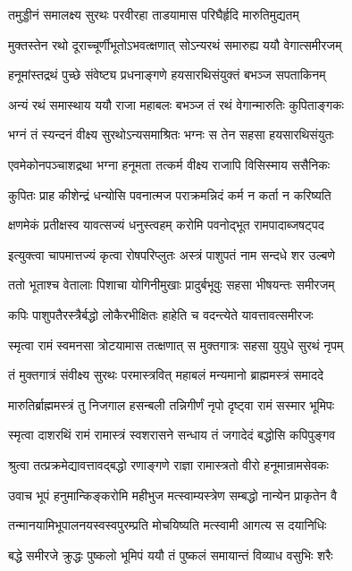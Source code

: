 \twolineshloka
{तमुड्डीनं समालक्ष्य सुरथः परवीरहा}
{ताडयामास परिघैर्हृदि मारुतिमुद्यतम्}%

\twolineshloka
{मुक्तस्तेन रथो दूराच्चूर्णीभूतोऽभवत्क्षणात्}
{सोऽन्यरथं समारुह्य ययौ वेगात्समीरजम्}%

\twolineshloka
{हनूमांस्तद्रथं पुच्छे संवेष्ट्य प्रधनाङ्गणे}
{हयसारथिसंयुक्तं बभञ्ज सपताकिनम्}%

\twolineshloka
{अन्यं रथं समास्थाय ययौ राजा महाबलः}
{बभञ्ज तं रथं वेगान्मारुतिः कुपिताङ्गकः}%

\twolineshloka
{भग्नं तं स्यन्दनं वीक्ष्य सुरथोऽन्यसमाश्रितः}
{भग्नः स तेन सहसा हयसारथिसंयुतः}%

\twolineshloka
{एवमेकोनपञ्चाशद्रथा भग्ना हनूमता}
{तत्कर्म वीक्ष्य राजापि विसिस्माय ससैनिकः}%

\twolineshloka
{कुपितः प्राह कीशेन्द्रं धन्योसि पवनात्मज}
{पराक्रमन्निदं कर्म न कर्ता न करिष्यति}%

\twolineshloka
{क्षणमेकं प्रतीक्षस्व यावत्सज्यं धनुस्त्वहम्}
{करोमि पवनोद्भूत रामपादाब्जषट्पद}%

\twolineshloka
{इत्युक्त्वा चापमात्तज्यं कृत्वा रोषपरिप्लुतः}
{अस्त्रं पाशुपतं नाम सन्दधे शर उल्बणे}%

\twolineshloka
{ततो भूताश्च वेतालाः पिशाचा योगिनीमुखाः}
{प्रादुर्बभूवुः सहसा भीषयन्तः समीरजम्}%

\twolineshloka
{कपिः पाशुपतैरस्त्रैर्बद्धो लोकैरभीक्षितः}
{हाहेति च वदन्त्येते यावत्तावत्समीरजः}%

\twolineshloka
{स्मृत्वा रामं स्वमनसा त्रोटयामास तत्क्षणात्}
{स मुक्तगात्रः सहसा युयुधे सुरथं नृपम्}%

\twolineshloka
{तं मुक्तगात्रं संवीक्ष्य सुरथः परमास्त्रवित्}
{महाबलं मन्यमानो ब्राह्ममस्त्रं समाददे}%

\twolineshloka
{मारुतिर्ब्राह्ममस्त्रं तु निजगाल हसन्बली}
{तन्निगीर्णं नृपो दृष्ट्वा रामं सस्मार भूमिपः}%

\twolineshloka
{स्मृत्वा दाशरथिं रामं रामास्त्रं स्वशरासने}
{सन्धाय तं जगादेदं बद्धोसि कपिपुङ्गव}%

\twolineshloka
{श्रुत्वा तत्प्रक्रमेद्यावत्तावद्बद्धो रणाङ्गणे}
{राज्ञा रामास्त्रतो वीरो हनूमान्रामसेवकः}%

\twolineshloka
{उवाच भूपं हनुमान्किङ्करोमि महीभुज}
{मत्स्वाम्यस्त्रेण सम्बद्धो नान्येन प्राकृतेन वै}%

\twolineshloka
{तन्मानयामिभूपालनयस्वस्वपुरम्प्रति}
{मोचयिष्यति मत्स्वामी आगत्य स दयानिधिः}%

\twolineshloka
{बद्धे समीरजे क्रुद्धः पुष्कलो भूमिपं ययौ}
{तं पुष्कलं समायान्तं विव्याध वसुभिः शरैः}%

